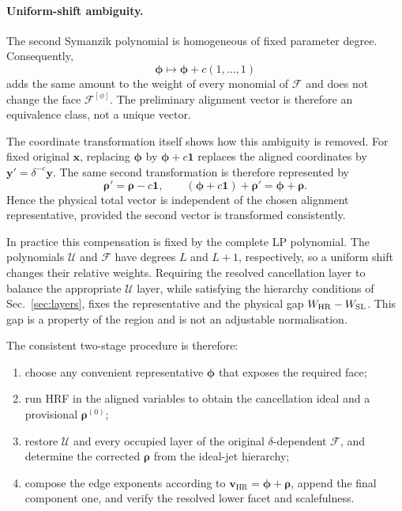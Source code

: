 \documentclass[a4paper,11pt]{article}
\newcommand{\x}{\boldsymbol{x}}
\newcommand{\HR}{\mathrm{HR}}
\newcommand{\WSL}{W_{\rm SL}}
\newcommand{\WHR}{W_{\rm HR}}
\begin{document}
\paragraph{Uniform-shift ambiguity.}

The second Symanzik polynomial is homogeneous of fixed parameter degree.
Consequently,
\begin{equation}
 \boldsymbol\phi\longmapsto
 \boldsymbol\phi+c(1,\ldots,1)
\label{eq:uniformshift}
\end{equation}
adds the same amount to the weight of every monomial of \(\mathcal F\) and
does not change the face \(\mathcal F^{[\phi]}\).  The preliminary alignment
vector is therefore an equivalence class, not a unique vector.

The coordinate transformation itself shows how this ambiguity is removed.
For fixed original \(\x\), replacing
\(\boldsymbol\phi\) by \(\boldsymbol\phi+c\boldsymbol1\) replaces the aligned
coordinates by \(\boldsymbol y'=\delta^{-c}\boldsymbol y\).  The same second
transformation is therefore represented by
\begin{equation}
 \boldsymbol\rho' = \boldsymbol\rho-c\boldsymbol1,
 \qquad
 (\boldsymbol\phi+c\boldsymbol1)+\boldsymbol\rho'
 =\boldsymbol\phi+\boldsymbol\rho.
 \label{eq:shift-covariant-composition}
\end{equation}
Hence the physical total vector is independent of the chosen alignment
representative, provided the second vector is transformed consistently.

In practice this compensation is fixed by the complete LP polynomial.
The polynomials \(\mathcal U\) and \(\mathcal F\) have degrees \(L\) and
\(L+1\), respectively, so a uniform shift changes their relative weights.
Requiring the resolved cancellation layer to balance the appropriate
\(\mathcal U\) layer, while satisfying the hierarchy conditions of
Sec.~\ref{sec:layers}, fixes
the representative and the physical gap \(\WHR-\WSL\).  This gap is a
property of the region and is not an adjustable normalisation.

The consistent two-stage procedure is therefore:
\begin{enumerate}[label=(\roman*)]
 \item choose any convenient representative \(\boldsymbol\phi\) that exposes
 the required face;
 \item run HRF in the aligned variables to obtain the cancellation ideal and
 a provisional \(\boldsymbol\rho^{(0)}\);
 \item restore \(\mathcal U\) and every occupied layer of the original
 \(\delta\)-dependent \(\mathcal F\), and determine the corrected
 \(\boldsymbol\rho\) from the ideal-jet hierarchy;
 \item compose the edge exponents according to
 \(\boldsymbol v_{\HR}=\boldsymbol\phi+\boldsymbol\rho\), append the final
 component one, and verify the resolved lower facet and scalefulness.
\end{enumerate}
\end{document}
